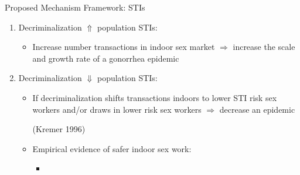 \documentclass{beamer}
\begin{document}
\begin{frame}{Proposed Mechanism Framework: STIs}
\begin{enumerate}
  \item Decriminalization $\Uparrow$ population STIs:
  \begin{itemize}
    \item Increase number transactions in indoor sex market $\Rightarrow$ increase the scale and growth rate of a gonorrhea epidemic 
  \end{itemize}
  \item Decriminalization $\Downarrow$ population STIs:
 \begin{itemize}
  \item If decriminalization shifts transactions indoors to lower STI risk sex workers and/or draws in lower risk sex workers $\Rightarrow$ decrease an epidemic \begin{footnotesize}(Kremer 1996)\end{footnotesize}
  \item \begin{footnotesize}Empirical evidence of safer indoor sex work:\end{footnotesize}
   \begin{itemize}
   \item {}
\end{itemize}
  \end{itemize}
\end{enumerate}
\end{frame}
\end{document}

